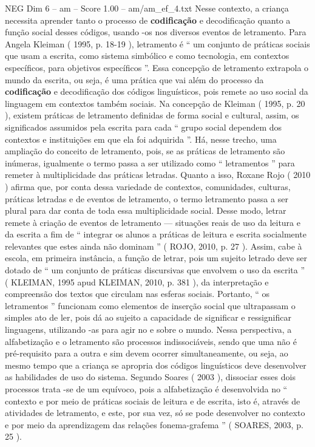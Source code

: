 \begin{textsample}{NEG Dim 6 – am – Score 1.00 – am/am\_ef\_4.txt}
Nesse contexto, a criança necessita aprender tanto o processo de \textbf{codificação} e decodificação quanto a função social desses códigos, usando -os nos diversos eventos de letramento.
Para Angela Kleiman ( 1995, p. 18-19 ), letramento é “ um conjunto de práticas sociais que usam a escrita, como sistema simbólico e como tecnologia, em contextos específicos, para objetivos específicos ”.
Essa concepção de letramento extrapola o mundo da escrita, ou seja, é uma prática que vai além do processo da \textbf{codificação} e decodificação dos códigos linguísticos, pois remete ao uso social da linguagem em contextos também sociais.
Na concepção de Kleiman ( 1995, p. 20 ), existem práticas de letramento definidas de forma social e cultural, assim, os significados assumidos pela escrita para cada “ grupo social dependem dos contextos e instituições em que ela foi adquirida ”.
Há, nesse trecho, uma ampliação do conceito de letramento, pois, se as práticas de letramento são inúmeras, igualmente o termo passa a ser utilizado como “ letramentos ” para remeter à multiplicidade das práticas letradas.
Quanto a isso, Roxane Rojo ( 2010 ) afirma que, por conta dessa variedade de contextos, comunidades, culturas, práticas letradas e de eventos de letramento, o termo letramento passa a ser plural para dar conta de toda essa multiplicidade social.
Desse modo, letrar remete à criação de eventos de letramento — situações reais de uso da leitura e da escrita a fim de “ integrar os alunos a práticas de leitura e escrita socialmente relevantes que estes ainda não dominam ” ( ROJO, 2010, p. 27 ).
Assim, cabe à escola, em primeira instância, a função de letrar, pois um sujeito letrado deve ser dotado de “ um conjunto de práticas discursivas que envolvem o uso da escrita ” ( KLEIMAN, 1995 apud KLEIMAN, 2010, p. 381 ), da interpretação e compreensão dos textos que circulam nas esferas sociais.
Portanto, “ os letramentos ” funcionam como elementos de inserção social que ultrapassam o simples ato de ler, pois dá ao sujeito a capacidade de significar e ressignificar linguagens, utilizando -as para agir no e sobre o mundo.
Nessa perspectiva, a alfabetização e o letramento são processos indissociáveis, sendo que uma não é pré-requisito para a outra e sim devem ocorrer simultaneamente, ou seja, ao mesmo tempo que a criança se apropria dos códigos linguísticos deve desenvolver as habilidades de uso do sistema.
Segundo Soares ( 2003 ), dissociar esses dois processos trata -se de um equívoco, pois a alfabetização é desenvolvida no “ contexto e por meio de práticas sociais de leitura e de escrita, isto é, através de atividades de letramento, e este, por sua vez, só se pode desenvolver no contexto e por meio da aprendizagem das relações fonema-grafema ” ( SOARES, 2003, p. 25 ).

\end{textsample}
